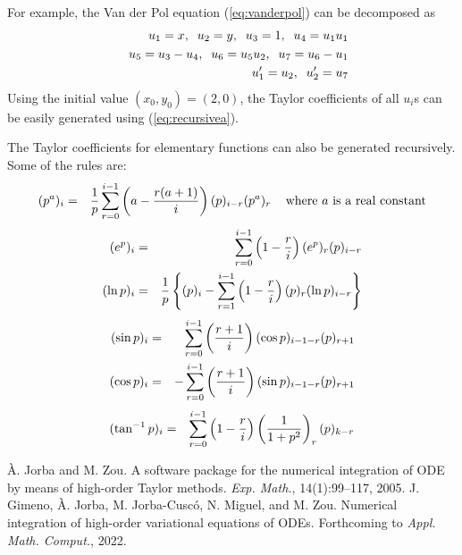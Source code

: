 \documentclass[10pt]{article}
\theoremstyle{remark}
\begin{document}
For example, the Van der Pol equation (\ref{eq:vanderpol}) can be
decomposed as
\begin{eqnarray*}
& & u_1 = x,\;\;  u_2 = y,\;\; u_3 = 1,\;\; u_4= u_1 u_1\cr
& & u_5 = u_3-u_4,\;\; u_6 = u_5 u_2,\;\; u_7= u_6-u_1\cr
& & u_1' = u_2, \;\; u_2'= u_7
\end{eqnarray*}
Using the initial value $(x_0, y_0)=(2, 0)$, the Taylor coefficients
of all $u_i$s can be easily generated using (\ref{eq:recursivea}).


The Taylor coefficients for elementary functions can also be generated
recursively. Some of the rules are:
\begin{eqnarray*}
(p^a)_i &=& {1 \over p} \sum_{r=0}^{i-1}\left(
a - { {r(a+1)\over i}}\right)(p)_{i-r}(p^a)_r\;\;\; \mbox{
where $a$ is a real constant} 
\end{eqnarray*}
\begin{eqnarray*}
(e^p)_i &=& \sum_{r=0}^{i-1} \left(1-{r\over i}\right)
(e^p)_r (p)_{i-r}\cr
(\ln p)_i &=& {1\over {p}} \left\{ (p)_i - \sum_{r=1}^{i-1}
\left(1 - {r\over i}\right)(p)_r(\ln p)_{i-r}\right\}
\end{eqnarray*}
\begin{eqnarray*}
(\sin p)_i &=& \sum_{r=0}^{i-1}\left({{r+1}\over
i}\right)(\cos p)_{i-1-r} (p)_{r+1}\cr
(\cos p)_i &=& -\sum_{r=0}^{i-1}\left({{r+1}\over
i}\right)(\sin p)_{i-1-r} (p)_{r+1}\cr
\end{eqnarray*}
\begin{eqnarray*}
(\tan^{-1} p)_i &=& \sum_{r=0}^{i-1}\left(1 - {r\over i}\right)
\left( {1 \over {1+p^2}}\right)_r (p)_{k-r}
\end{eqnarray*}



\begin{thebibliography}{9}
 \`A. Jorba and M. Zou. A software package for the
  numerical integration of ODE by means of high-order Taylor
  methods. {\it Exp. Math.}, 14(1):99–117, 2005.
 J. Gimeno, \`A. Jorba, M. Jorba-Cusc\'o, N. Miguel,
  and M. Zou. Numerical integration of high-order variational
  equations of ODEs. Forthcoming to {\it Appl. Math. Comput.}, 2022.
\end{thebibliography}
\end{document}

